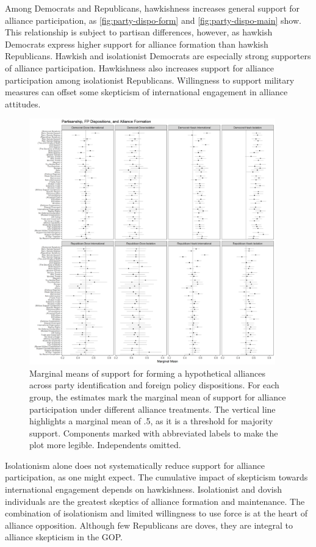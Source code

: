 \documentclass[12pt]{article}
\begin{document}
Among Democrats and Republicans, hawkishness increases general support for alliance participation, as \autoref{fig:party-dispo-form} and \autoref{fig:party-dispo-main} show. 
This relationship is subject to partisan differences, however, as hawkish Democrats express higher support for alliance formation than hawkish Republicans. 
Hawkish and isolationist Democrats are especially strong supporters of alliance participation. 
Hawkishness also increases support for alliance participation among isolationist Republicans. 
Willingness to support military measures can offset some skepticism of international engagement in alliance attitudes. 


\begin{figure}
	\centering
		\includegraphics[width=0.95\textwidth]{../figures/party-dispo-form.png}
	\caption{Marginal means of support for forming a hypothetical alliances across party identification and foreign policy dispositions. For each group, the estimates mark the marginal mean of support for alliance participation under different alliance treatments. The vertical line highlights a marginal mean of .5, as it is a threshold for majority support. Components marked with abbreviated labels to make the plot more legible. Independents omitted.}
	\label{fig:party-dispo-form}
\end{figure}


Isolationism alone does not systematically reduce support for alliance participation, as one might expect.
The cumulative impact of skepticism towards international engagement depends on hawkishness. 
Isolationist and dovish individuals are the greatest skeptics of alliance formation and maintenance. 
The combination of isolationism and limited willingness to use force is at the heart of alliance opposition. 
Although few Republicans are doves, they are integral to alliance skepticism in the GOP. 
\end{document}
